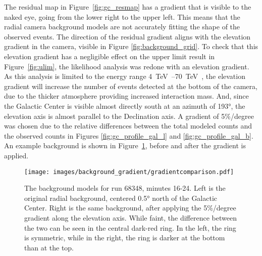   The residual map in Figure~\ref{fig:gc_resmap} has a gradient that is visible to the naked eye, going from the lower right to the upper left.
  This means that the radial camera background models are not accurately fitting the shape of the observed events.
  The direction of the residual gradient aligns with the elevation gradient in the camera, visible in Figure \ref{fig:background_grid}.
  To check that this elevation gradient has a negligible effect on the upper limit result in Figure~\ref{fig:ulim}, the likelihood analysis was redone with an elevation gradient.
  As this analysis is limited to the energy range \SIrange{4}{70}{\TeV{}}, the elevation gradient will increase the number of events detected at the bottom of the camera, due to the thicker atmosphere providing increased interaction mass.
  And, since the Galactic Center is visible almost directly south at an azimuth of \ang{193}, the elevation axis is almost parallel to the Declination axis.
  A gradient of 5\%/degree was chosen due to the relative differences between the total modeled counts and the observed counts in Figures \ref{fig:gc_profile_gal_l} and \ref{fig:gc_profile_gal_b}.
  An example background is shown in Figure~\ref{fig:bkg_flatvsgrad}, before and after the gradient is applied.
  
  \begin{figure}[ht]
    \centering
    \texttt{[image: images/background\_gradient/gradientcomparison.pdf]}
    \caption[Background Gradient Comparison]{
      The background models for run 68348, minutes 16-24.
      Left is the original radial background, centered \ang{0.5} north of the Galactic Center.
      Right is the same background, after applying the 5\%/degree gradient along the elevation axis.
      While faint, the difference between the two can be seen in the central dark-red ring.
      In the left, the ring is symmetric, while in the right, the ring is darker at the bottom than at the top.
    }
    \label{fig:bkg_flatvsgrad}
  \end{figure}
  
